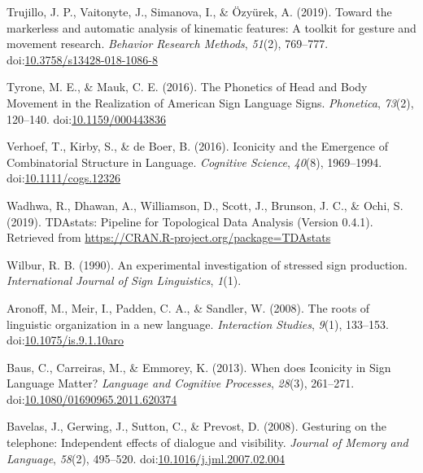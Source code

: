 \documentclass[
  man, noextraspace,floatsintext]{apa6}
\newlength{\cslhangindent}
\newenvironment{cslreferences}%
  {\setlength{\parindent}{0pt}%
  \everypar{\setlength{\hangindent}{\cslhangindent}}\ignorespaces}%
  {\par}
\begin{document}
\begin{cslreferences}
\leavevmode\hypertarget{ref-trujilloMarkerlessAutomaticAnalysis2019}{}%
Trujillo, J. P., Vaitonyte, J., Simanova, I., \& Özyürek, A. (2019). Toward the markerless and automatic analysis of kinematic features: A toolkit for gesture and movement research. \emph{Behavior Research Methods}, \emph{51}(2), 769--777. doi:\href{https://doi.org/10.3758/s13428-018-1086-8}{10.3758/s13428-018-1086-8}

\leavevmode\hypertarget{ref-tyronePhoneticsHeadBody2016}{}%
Tyrone, M. E., \& Mauk, C. E. (2016). The Phonetics of Head and Body Movement in the Realization of American Sign Language Signs. \emph{Phonetica}, \emph{73}(2), 120--140. doi:\href{https://doi.org/10.1159/000443836}{10.1159/000443836}

\leavevmode\hypertarget{ref-verhoefIconicityEmergenceCombinatorial2016}{}%
Verhoef, T., Kirby, S., \& de Boer, B. (2016). Iconicity and the Emergence of Combinatorial Structure in Language. \emph{Cognitive Science}, \emph{40}(8), 1969--1994. doi:\href{https://doi.org/10.1111/cogs.12326}{10.1111/cogs.12326}

\leavevmode\hypertarget{ref-wadhwaTDAstatsPipelineTopological2019}{}%
Wadhwa, R., Dhawan, A., Williamson, D., Scott, J., Brunson, J. C., \& Ochi, S. (2019). TDAstats: Pipeline for Topological Data Analysis (Version 0.4.1). Retrieved from \url{https://CRAN.R-project.org/package=TDAstats}

\leavevmode\hypertarget{ref-wilburExperimentalInvestigationStressed1990}{}%
Wilbur, R. B. (1990). An experimental investigation of stressed sign production. \emph{International Journal of Sign Linguistics}, \emph{1}(1).

\leavevmode\hypertarget{ref-aronoffRootsLinguisticOrganization2008}{}%
Aronoff, M., Meir, I., Padden, C. A., \& Sandler, W. (2008). The roots of linguistic organization in a new language. \emph{Interaction Studies}, \emph{9}(1), 133--153. doi:\href{https://doi.org/10.1075/is.9.1.10aro}{10.1075/is.9.1.10aro}

\leavevmode\hypertarget{ref-bausWhenDoesIconicity2013}{}%
Baus, C., Carreiras, M., \& Emmorey, K. (2013). When does Iconicity in Sign Language Matter? \emph{Language and Cognitive Processes}, \emph{28}(3), 261--271. doi:\href{https://doi.org/10.1080/01690965.2011.620374}{10.1080/01690965.2011.620374}

\leavevmode\hypertarget{ref-bavelasGesturingTelephoneIndependent2008}{}%
Bavelas, J., Gerwing, J., Sutton, C., \& Prevost, D. (2008). Gesturing on the telephone: Independent effects of dialogue and visibility. \emph{Journal of Memory and Language}, \emph{58}(2), 495--520. doi:\href{https://doi.org/10.1016/j.jml.2007.02.004}{10.1016/j.jml.2007.02.004}


\end{cslreferences}
\end{document}
